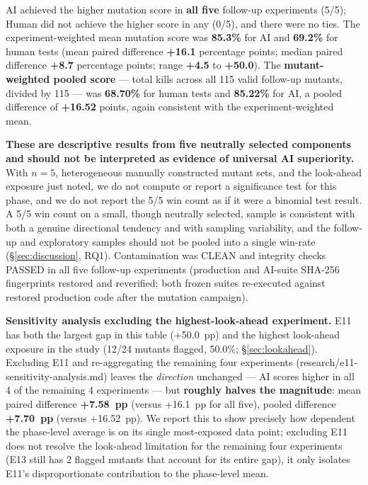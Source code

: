 \documentclass[10pt,conference]{IEEEtran}
\begin{document}
AI achieved the higher mutation score in \textbf{all five} follow-up experiments (5/5); Human did not achieve the higher score in any (0/5), and there were no ties. The experiment-weighted mean mutation score was \textbf{85.3\%} for AI and \textbf{69.2\%} for human tests (mean paired difference \textbf{+16.1} percentage points; median paired difference \textbf{+8.7} percentage points; range \textbf{+4.5} to \textbf{+50.0}). The \textbf{mutant-weighted pooled score} — total kills across all 115 valid follow-up mutants, divided by 115 — was \textbf{68.70\%} for human tests and \textbf{85.22\%} for AI, a pooled difference of \textbf{+16.52} points, again consistent with the experiment-weighted mean.

\textbf{These are descriptive results from five neutrally selected components and should not be interpreted as evidence of universal AI superiority.} With $n=5$, heterogeneous manually constructed mutant sets, and the look-ahead exposure just noted, we do not compute or report a significance test for this phase, and we do not report the 5/5 win count as if it were a binomial test result. A 5/5 win count on a small, though neutrally selected, sample is consistent with both a genuine directional tendency and with sampling variability, and the follow-up and exploratory samples should not be pooled into a single win-rate (\S\ref{sec:discussion}, RQ1). Contamination was CLEAN and integrity checks PASSED in all five follow-up experiments (production and AI-suite SHA-256 fingerprints restored and reverified; both frozen suites re-executed against restored production code after the mutation campaign).

\textbf{Sensitivity analysis excluding the highest-look-ahead experiment.} E11 has both the largest gap in this table (+50.0~pp) and the highest look-ahead exposure in the study (12/24 mutants flagged, 50.0\%; \S\ref{sec:lookahead}). Excluding E11 and re-aggregating the remaining four experiments (research/e11-sensitivity-analysis.md) leaves the \emph{direction} unchanged — AI scores higher in all 4 of the remaining 4 experiments — but \textbf{roughly halves the magnitude}: mean paired difference \textbf{+7.58~pp} (versus +16.1~pp for all five), pooled difference \textbf{+7.70~pp} (versus +16.52~pp). We report this to show precisely how dependent the phase-level average is on its single most-exposed data point; excluding E11 does not resolve the look-ahead limitation for the remaining four experiments (E13 still has 2 flagged mutants that account for its entire gap), it only isolates E11's disproportionate contribution to the phase-level mean.
\end{document}

